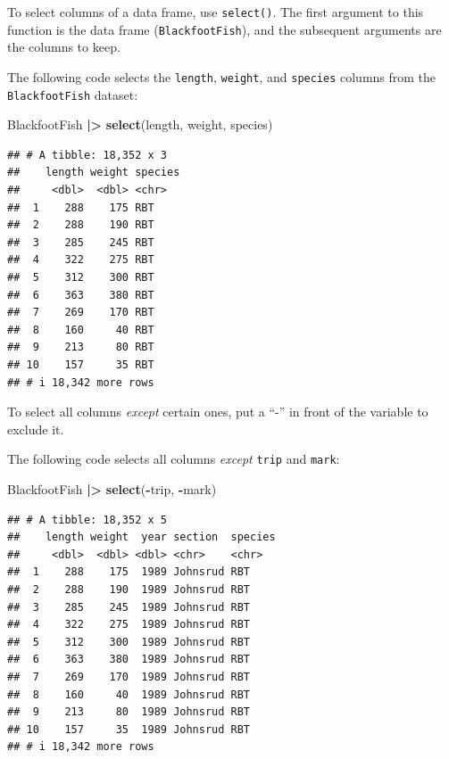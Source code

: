 \documentclass[
  10pt,
  letterpaper,
  twoside,
  openright]{book}
\newenvironment{Shaded}{\begin{snugshade}}{\end{snugshade}}
\newcommand{\FunctionTok}[1]{\textcolor[rgb]{0.13,0.29,0.53}{\textbf{#1}}}
\newcommand{\NormalTok}[1]{#1}
\newcommand{\SpecialCharTok}[1]{\textcolor[rgb]{0.81,0.36,0.00}{\textbf{#1}}}
\begin{document}
To select columns of a data frame, use \texttt{select()}. The first
argument to this function is the data frame (\texttt{BlackfootFish}),
and the subsequent arguments are the columns to keep.

The following code selects the \texttt{length}, \texttt{weight}, and
\texttt{species} columns from the \texttt{BlackfootFish} dataset:

\begin{Shaded}
\begin{Highlighting}[]
\NormalTok{BlackfootFish }\SpecialCharTok{|\textgreater{}}
  \FunctionTok{select}\NormalTok{(length, weight, species)}
\end{Highlighting}
\end{Shaded}

\begin{verbatim}
## # A tibble: 18,352 x 3
##    length weight species
##     <dbl>  <dbl> <chr>  
##  1    288    175 RBT    
##  2    288    190 RBT    
##  3    285    245 RBT    
##  4    322    275 RBT    
##  5    312    300 RBT    
##  6    363    380 RBT    
##  7    269    170 RBT    
##  8    160     40 RBT    
##  9    213     80 RBT    
## 10    157     35 RBT    
## # i 18,342 more rows
\end{verbatim}

To select all columns \emph{except} certain ones, put a ``-'' in front
of the variable to exclude it.

The following code selects all columns \emph{except} \texttt{trip} and
\texttt{mark}:

\begin{Shaded}
\begin{Highlighting}[]
\NormalTok{BlackfootFish }\SpecialCharTok{|\textgreater{}}
  \FunctionTok{select}\NormalTok{(}\SpecialCharTok{{-}}\NormalTok{trip, }\SpecialCharTok{{-}}\NormalTok{mark)}
\end{Highlighting}
\end{Shaded}

\begin{verbatim}
## # A tibble: 18,352 x 5
##    length weight  year section  species
##     <dbl>  <dbl> <dbl> <chr>    <chr>  
##  1    288    175  1989 Johnsrud RBT    
##  2    288    190  1989 Johnsrud RBT    
##  3    285    245  1989 Johnsrud RBT    
##  4    322    275  1989 Johnsrud RBT    
##  5    312    300  1989 Johnsrud RBT    
##  6    363    380  1989 Johnsrud RBT    
##  7    269    170  1989 Johnsrud RBT    
##  8    160     40  1989 Johnsrud RBT    
##  9    213     80  1989 Johnsrud RBT    
## 10    157     35  1989 Johnsrud RBT    
## # i 18,342 more rows
\end{verbatim}
\end{document}
